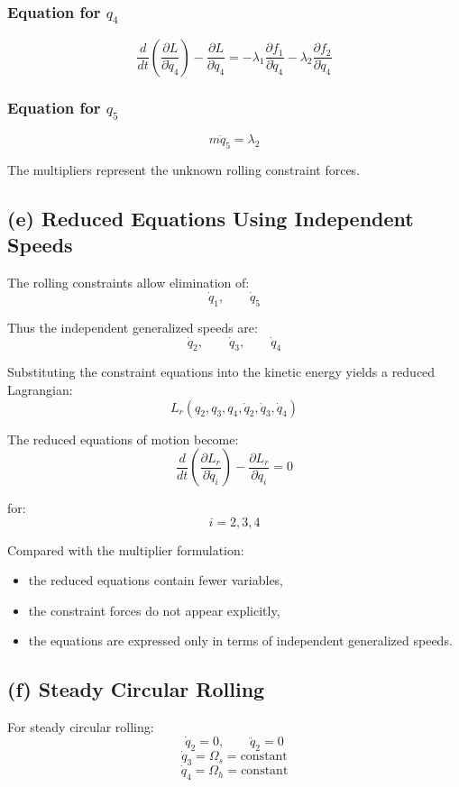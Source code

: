 \subsubsection*{Equation for $q_4$}

\[
\frac{d}{dt}\left(\frac{\partial L}{\partial\dot q_4}\right)
-
\frac{\partial L}{\partial q_4}
=
-\lambda_1\frac{\partial f_1}{\partial\dot q_4}
-
\lambda_2\frac{\partial f_2}{\partial\dot q_4}
\]

\subsubsection*{Equation for $q_5$}

\[
m\ddot q_5 = \lambda_2
\]

The multipliers represent the unknown rolling constraint forces.

\subsection*{(e) Reduced Equations Using Independent Speeds}

The rolling constraints allow elimination of:
\[
\dot q_1,
\qquad
\dot q_5
\]

Thus the independent generalized speeds are:
\[
\dot q_2,
\qquad
\dot q_3,
\qquad
\dot q_4
\]

Substituting the constraint equations into the kinetic energy yields a reduced Lagrangian:
\[
L_r(q_2,q_3,q_4,\dot q_2,\dot q_3,\dot q_4)
\]

The reduced equations of motion become:
\[
\frac{d}{dt}
\left(
\frac{\partial L_r}{\partial\dot q_i}
\right)
-
\frac{\partial L_r}{\partial q_i}
=0
\]

for:
\[
i=2,3,4
\]

Compared with the multiplier formulation:
\begin{itemize}
    \item the reduced equations contain fewer variables,
    \item the constraint forces do not appear explicitly,
    \item the equations are expressed only in terms of independent generalized speeds.
\end{itemize}

\subsection*{(f) Steady Circular Rolling}

For steady circular rolling:
\[
\dot q_2 = 0,
\qquad
\ddot q_2 = 0
\]
\[
\dot q_3 = \Omega_s = \text{constant}
\]
\[
\dot q_4 = \Omega_h = \text{constant}
\]

